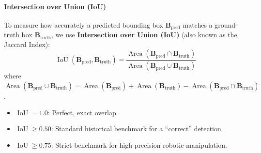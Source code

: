 \paragraph{Intersection over Union (IoU)}
To measure how accurately a predicted bounding box $\mathbf{B}_{\text{pred}}$ matches a ground-truth box $\mathbf{B}_{\text{truth}}$, we use \textbf{Intersection over Union (IoU)} (also known as the Jaccard Index):
\begin{equation}
\operatorname{IoU}(\mathbf{B}_{\text{pred}}, \mathbf{B}_{\text{truth}}) = \frac{\operatorname{Area}(\mathbf{B}_{\text{pred}} \cap \mathbf{B}_{\text{truth}})}{\operatorname{Area}(\mathbf{B}_{\text{pred}} \cup \mathbf{B}_{\text{truth}})}\label{eq:iou_formula}
\end{equation}
where $\operatorname{Area}(\mathbf{B}_{\text{pred}} \cup \mathbf{B}_{\text{truth}}) = \operatorname{Area}(\mathbf{B}_{\text{pred}}) + \operatorname{Area}(\mathbf{B}_{\text{truth}}) - \operatorname{Area}(\mathbf{B}_{\text{pred}} \cap \mathbf{B}_{\text{truth}})$.
\begin{itemize}
    \item $\operatorname{IoU} = 1.0$: Perfect, exact overlap.
    \item $\operatorname{IoU} \ge 0.50$: Standard historical benchmark for a ``correct'' detection.
    \item $\operatorname{IoU} \ge 0.75$: Strict benchmark for high-precision robotic manipulation.
\end{itemize}

